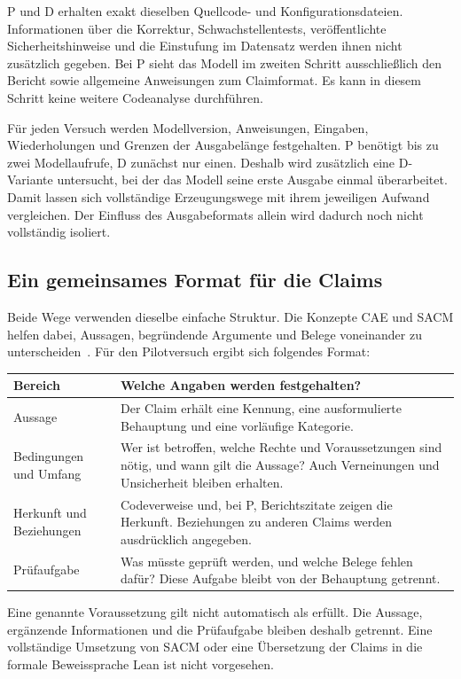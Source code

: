 \documentclass[10pt,a4paper]{article}
\begin{document}
P und D erhalten exakt dieselben Quellcode- und Konfigurationsdateien. Informationen über die Korrektur, Schwachstellentests, veröffentlichte Sicherheitshinweise und die Einstufung im Datensatz werden ihnen nicht zusätzlich gegeben. Bei P sieht das Modell im zweiten Schritt ausschlie\ss{}lich den Bericht sowie allgemeine Anweisungen zum Claimformat. Es kann in diesem Schritt keine weitere Codeanalyse durchführen.

Für jeden Versuch werden Modellversion, Anweisungen, Eingaben, Wiederholungen und Grenzen der Ausgabelänge festgehalten. P benötigt bis zu zwei Modellaufrufe, D zunächst nur einen. Deshalb wird zusätzlich eine D-Variante untersucht, bei der das Modell seine erste Ausgabe einmal überarbeitet. Damit lassen sich vollständige Erzeugungswege mit ihrem jeweiligen Aufwand vergleichen. Der Einfluss des Ausgabeformats allein wird dadurch noch nicht vollständig isoliert.

\newpage
\subsection{Ein gemeinsames Format für die Claims}
Beide Wege verwenden dieselbe einfache Struktur. Die Konzepte CAE und SACM helfen dabei, Aussagen, begründende Argumente und Belege voneinander zu unterscheiden~\cite{cae,sacm}. Für den Pilotversuch ergibt sich folgendes Format:

\begin{tabularx}{\linewidth}{@{}>{\raggedright\arraybackslash}p{33mm}Y@{}}
\toprule
\textbf{Bereich} & \textbf{Welche Angaben werden festgehalten?} \\ \midrule
Aussage & Der Claim erhält eine Kennung, eine ausformulierte Behauptung und eine vorläufige Kategorie. \\
Bedingungen und Umfang & Wer ist betroffen, welche Rechte und Voraussetzungen sind nötig, und wann gilt die Aussage? Auch Verneinungen und Unsicherheit bleiben erhalten. \\
Herkunft und Beziehungen & Codeverweise und, bei P, Berichtszitate zeigen die Herkunft. Beziehungen zu anderen Claims werden ausdrücklich angegeben. \\
Prüfaufgabe & Was müsste geprüft werden, und welche Belege fehlen dafür? Diese Aufgabe bleibt von der Behauptung getrennt. \\
\bottomrule
\end{tabularx}

Eine genannte Voraussetzung gilt nicht automatisch als erfüllt. Die Aussage, ergänzende Informationen und die Prüfaufgabe bleiben deshalb getrennt. Eine vollständige Umsetzung von SACM oder eine Übersetzung der Claims in die formale Beweissprache Lean ist nicht vorgesehen.
\end{document}
